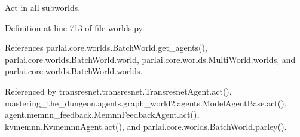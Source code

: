 \begin{DoxyVerb}Act in all subworlds.\end{DoxyVerb}
 

Definition at line 713 of file worlds.\+py.



References parlai.\+core.\+worlds.\+Batch\+World.\+get\+\_\+agents(), parlai.\+core.\+worlds.\+Batch\+World.\+world, parlai.\+core.\+worlds.\+Multi\+World.\+worlds, and parlai.\+core.\+worlds.\+Batch\+World.\+worlds.



Referenced by transresnet.\+transresnet.\+Transresnet\+Agent.\+act(), mastering\+\_\+the\+\_\+dungeon.\+agents.\+graph\+\_\+world2.\+agents.\+Model\+Agent\+Base.\+act(), agent.\+memnn\+\_\+feedback.\+Memnn\+Feedback\+Agent.\+act(), kvmemnn.\+Kvmemnn\+Agent.\+act(), and parlai.\+core.\+worlds.\+Batch\+World.\+parley().

